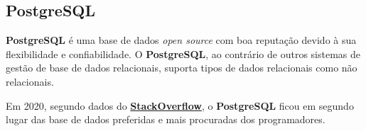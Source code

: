 \subsection{PostgreSQL}

\begin{minipage}[t]{.3\textwidth}
\end{minipage}
\begin{minipage}[t]{.7\textwidth}
	\minipagerestore
	\textbf{PostgreSQL} é uma base de dados \textit{open source} com boa reputação devido à sua flexibilidade e confiabilidade. O \textbf{PostgreSQL}, ao contrário de outros sistemas de gestão de base de dados relacionais, suporta tipos de dados relacionais como não relacionais.

	Em 2020, segundo dados do \href{https://insights.stackoverflow.com/survey/2020#technology-most-loved-dreaded-and-wanted-databases-loved4}{\textbf{StackOverflow}}, o \textbf{PostgreSQL} ficou em segundo lugar das base de dados preferidas e mais procuradas dos programadores.
\end{minipage}

